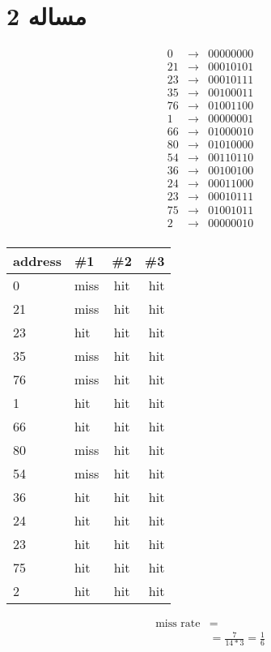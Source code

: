 \documentclass[11pt]{article}
\begin{document}
\section{مساله 2}
\begin{align*}
	0& \rightarrow &0000 0000 \\
	21& \rightarrow &0001 0101 \\
	23& \rightarrow &0001 0111 \\
	35& \rightarrow &0010 0011 \\
	76& \rightarrow &0100 1100 \\
	1& \rightarrow  &0000 0001 \\
	66& \rightarrow &0100 0010 \\
	80& \rightarrow &0101 0000 \\
	54& \rightarrow &0011 0110 \\
	36& \rightarrow &0010 0100 \\
	24& \rightarrow &0001 1000 \\
	23& \rightarrow &0001 0111 \\
	75& \rightarrow &0100 1011 \\
	2& \rightarrow &0000 0010 \\
\end{align*}
\begin{center}
	\begin{tabular}{l || l | c | r}
		address & \#1 & \#2 & \#3 \\
		\hline
		0  & miss & hit & hit \\
		21 & miss & hit & hit \\
		23 & hit  & hit & hit \\
		35 & miss & hit & hit \\
		76 & miss & hit & hit \\
		1  & hit  & hit & hit \\
		66 & hit  & hit & hit \\
		80 & miss & hit & hit \\
		54 & miss & hit & hit \\
		36 & hit  & hit & hit \\
		24 & hit  & hit & hit \\
		23 & hit  & hit & hit \\
		75 & hit  & hit & hit \\
		2  & hit  & hit & hit \\
	\end{tabular}
\end{center}
\begin{align*}
	\text{miss rate} &= \\
	&= \frac{7}{14 * 3} = \frac{1}{6} \\
\end{align*}
\end{document}
